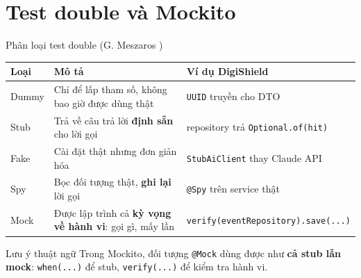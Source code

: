 \documentclass[aspectratio=169,12pt]{beamer}
\begin{document}
\section{Test double và Mockito}

\begin{frame}{Phân loại test double (G. Meszaros \cite{meszaros})}
  \begin{center}
  \footnotesize
  \setlength{\tabcolsep}{4pt}
  \begin{tabular}{>{\raggedright\arraybackslash}p{1.5cm}>{\raggedright\arraybackslash}p{5.6cm}>{\raggedright\arraybackslash}p{5.5cm}}
    \toprule
    \textbf{Loại} & \textbf{Mô tả} & \textbf{Ví dụ DigiShield} \\
    \midrule
    Dummy & Chỉ để lấp tham số, không bao giờ được dùng thật &
      \texttt{UUID} truyền cho DTO \\
    Stub & Trả về câu trả lời \textbf{định sẵn} cho lời gọi &
      repository trả \texttt{Optional.of(hit)} \\
    Fake & Cài đặt thật nhưng đơn giản hóa &
      \texttt{StubAiClient} thay Claude API \\
    Spy & Bọc đối tượng thật, \textbf{ghi lại} lời gọi &
      \texttt{@Spy} trên service thật \\
    Mock & Được lập trình cả \textbf{kỳ vọng về hành vi}: gọi gì, mấy lần &
      \texttt{verify(eventRepository)\allowbreak.save(...)} \\
    \bottomrule
  \end{tabular}
  \end{center}

  \begin{exampleblock}{Lưu ý thuật ngữ}
    Trong Mockito, đối tượng \texttt{@Mock} dùng được như \textbf{cả stub lẫn mock}:
    \texttt{when(...)} để stub, \texttt{verify(...)} để kiểm tra hành vi.
  \end{exampleblock}
\end{frame}
\end{document}
